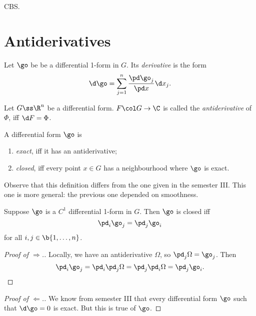 \documentclass[a4paper, 12pt]{article}
\begin{document}
\begin{idea}
  CBS.
\end{idea}

\section{Antiderivatives}

\begin{definition}
  Let $\go$ be be a differential 1-form in $G$.
  Its \emph{derivative} is the form
  $$ \d \go = \sum_{j=1}^n \frac{\pd \go_j}{\pd x} \d x_j. $$
\end{definition}

\begin{definition}
  Let $G \ss \R^n$ be a differential form.
  $F \col G \to \C$ is called the \emph{antiderivative} of $\Phi$, iff $\d F = \Phi$. 
\end{definition}

\begin{definition}
  A differential form $\go$ is
  \begin{enumerate}
    \item \emph{exact}, iff it has an antiderivative;
    \item \emph{closed}, iff every point $x \in G$ has a neighbourhood where $\go$ is exact.
  \end{enumerate}
\end{definition}

  Observe that this definition differs from the one given in the semester III. This one is more general: the previous one depended on smoothness.

\begin{lemma}
  Suppose $\go$ is a $C^1$ differential 1-form in $G$.
  Then $\go$ is closed iff
  $$ \pd_i \go_j = \pd_j \go_i $$
  for all $i, j \in \b{1, \dots, n}$.
\end{lemma}

\begin{proof}[Proof of $\Rightarrow$.]
  Locally, we have an antiderivative $\Omega$, so $\pd_j \Omega = \go_j$.
  Then
  $$ \pd_i \go_j = \pd_{i} \pd_j \Omega = \pd_j \pd_i \Omega = \pd_j \go_i. $$
\end{proof}

\begin{proof}[Proof of $\Leftarrow$.]
  We know from semester III that every differential form $\go$ such that $\d \go = 0$ is exact. But this is true of $\go$.
\end{proof}
\end{document}
